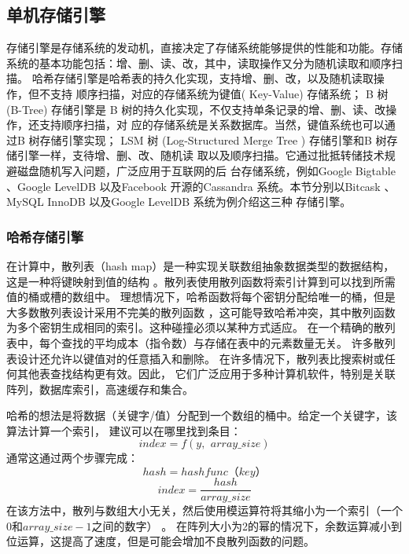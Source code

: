 \subsection{单机存储引擎}
存储引擎是存储系统的发动机，直接决定了存储系统能够提供的性能和功能。存储
系统的基本功能包括：增、删、读、改，其中，读取操作又分为随机读取和顺序扫描。
哈希存储引擎是哈希表的持久化实现，支持增、删、改，以及随机读取操作，但不支持
顺序扫描，对应的存储系统为键值( Key-Value) 存储系统； B 树(B-Tree) 存储引擎是
B 树的持久化实现，不仅支持单条记录的增、删、读、改操作，还支持顺序扫描，对
应的存储系统是关系数据库。当然，键值系统也可以通过B 树存储引擎实现； LSM 树
(Log-Structured Merge Tree ) 存储引擎和B 树存储引擎一样，支待增、删、改、随机读
取以及顺序扫描。它通过批抵转储技术规避磁盘随机写入问题，广泛应用于互联网的后
台存储系统，例如Google Bigtable 、Google LevelDB 以及Facebook 开源的Cassandra
系统。本节分别以Bitcask 、MySQL InnoDB 以及Google LevelDB 系统为例介绍这三种
存储引擎。
\subsubsection{哈希存储引擎}
在计算中，散列表（hash map）是一种实现关联数组抽象数据类型的数据结构，这是一种将键映射到值的结构
。散列表使用散列函数将索引计算到可以找到所需值的桶或槽的数组中。
理想情况下，哈希函数将每个密钥分配给唯一的桶，但是大多数散列表设计采用不完美的散列函数
，这可能导致哈希冲突，其中散列函数为多个密钥生成相同的索引。这种碰撞必须以某种方式适应。
在一个精确的散列表中，每个查找的平均成本（指令数）与存储在表中的元素数量无关。
许多散列表设计还允许以键值对的任意插入和删除。
在许多情况下，散列表比搜索树或任何其他表查找结构更有效。因此，
它们广泛应用于多种计算机软件，特别是关联阵列，数据库索引，高速缓存和集合。

哈希的想法是将数据（关键字/值）分配到一个数组的桶中。给定一个关键字，该算法计算一个索引，
建议可以在哪里找到条目：
\[ index = f\left( y,\,\ array\_size\right)  \]
通常这通过两个步骤完成：
\[ hash = hashfunc（key） \]
\[ index = \frac{hash}{array\_size} \]
在该方法中，散列与数组大小无关，然后使用模运算符将其缩小为一个索引（一个0和$ array\_size-1 $之间的数字）
。
在阵列大小为2的幂的情况下，余数运算减小到位运算，这提高了速度，但是可能会增加不良散列函数的问题。

